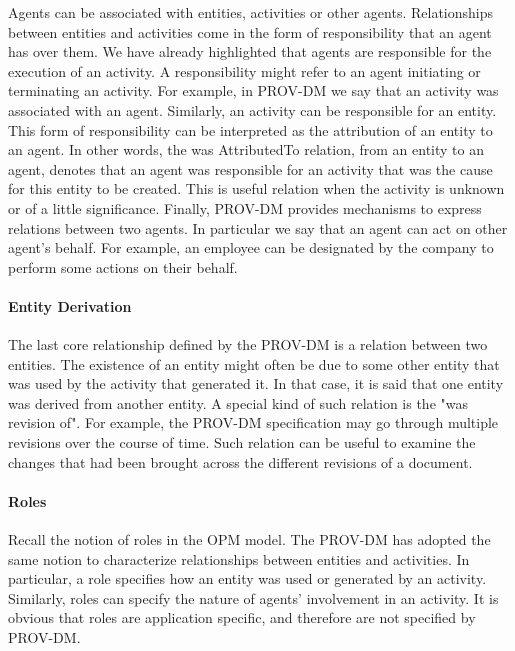 Agents can be associated with entities, activities or other agents. Relationships between entities and activities come in the form of responsibility that an agent has over them. We have already highlighted that agents are responsible for the execution of an activity. A responsibility might refer to an agent initiating or terminating an activity. For example, in PROV-DM we say that an activity was associated with an agent. Similarly, an activity can be responsible for an entity. This form of responsibility can be interpreted as the attribution of an entity to an agent. In other words, the was AttributedTo relation, from an entity to an agent, denotes that an agent was responsible for an activity that was the cause for this entity to be created. This is useful relation when the activity is unknown or of a little significance. Finally, PROV-DM provides mechanisms to express relations between two agents. In particular we say that an agent can act on other agent's behalf.  For example, an employee can be designated by the company to perform some actions on their behalf.

\paragraph{Entity Derivation}

The last core relationship defined by the PROV-DM is a relation between two entities. The existence of an entity might often be due to some other entity that was used by the activity that generated it. In that case, it is said that one entity was derived from another entity. A special kind of such relation is the "was revision of". For example, the PROV-DM specification may go through multiple revisions over the course of time. Such relation can be useful to examine the changes that had been brought across the different revisions of a document.

\paragraph{Roles}

Recall the notion of roles in the OPM model. The PROV-DM has adopted the same notion to characterize relationships between entities and activities. In particular, a role specifies how an entity was used or generated by an activity. Similarly, roles can specify the nature of agents' involvement in an activity. It is obvious that roles are application specific, and therefore are not specified by PROV-DM.

